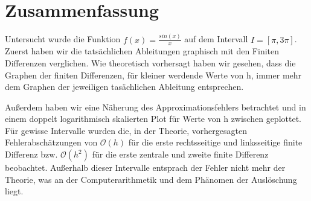 \documentclass{scrartcl}
\theoremstyle{remark}
\begin{document}
\section{Zusammenfassung}
Untersucht wurde die Funktion \(f(x) = \frac{sin(x)}{x}\) auf dem Intervall \(I = [\pi, 3\pi]\).
Zuerst haben wir die tatsächlichen Ableitungen graphisch mit den Finiten Differenzen verglichen. Wie theoretisch vorhersagt 
haben wir gesehen, dass die Graphen der finiten Differenzen, für kleiner werdende Werte von h, immer mehr dem Graphen
der jeweiligen tasächlichen Ableitung entsprechen.

Außerdem haben wir eine Näherung des Approximationsfehlers betrachtet und in einem doppelt logarithmisch skalierten Plot für 
Werte von h zwischen 
geplottet. Für gewisse Intervalle wurden die, in der Theorie, vorhergesagten Fehlerabschätzungen von \(\mathcal{O}(h)\) für die erste rechtsseitige und linksseitige finite Differenz bzw.
\(\mathcal{O}(h^{2})\) für die erste zentrale und zweite finite Differenz beobachtet.
Außerhalb dieser Intervalle entsprach der Fehler nicht mehr der Theorie, was an der Computerarithmetik und dem Phänomen
der Auslöschung liegt.


\printbibliography
\end{document}
